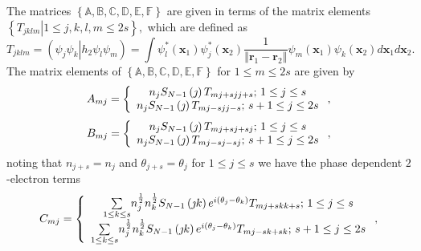 \documentclass[aps,preprint]{revtex4}%
\begin{document}
The matrices $\left\{  \mathbb{A},\mathbb{B},\mathbb{C},\mathbb{D}%
,\mathbb{E},\mathbb{F}\right\}  $ are given in terms of the matrix elements
$\left\{  \left.  T_{jklm}\right\vert 1\leq j,k,l,m\leq2s\right\}  ,$ which
are defined as
\begin{equation}
T_{jklm}=\left(  \left.  \psi_{j}\psi_{k}\right\vert h_{2}\psi_{l}\psi
_{m}\right)  =\int\psi_{l}^{\ast}\left(  \mathbf{x}_{1}\right)  \psi_{j}%
^{\ast}\left(  \mathbf{x}_{2}\right)  \frac{1}{\left\Vert \mathbf{r}%
_{1}-\mathbf{r}_{2}\right\Vert }\psi_{m}\left(  \mathbf{x}_{1}\right)
\psi_{k}\left(  \mathbf{x}_{2}\right)  d\mathbf{x}_{1}d\mathbf{x}_{2}.
\end{equation}
The matrix elements of $\left\{  \mathbb{A},\mathbb{B},\mathbb{C}%
,\mathbb{D},\mathbb{E},\mathbb{F}\right\}  $ for $1\leq m\leq2s$ are given by
\begin{equation}
A_{mj}=\left\{
\begin{array}
[c]{c}%
n_{j}S_{N-1}\left(  \jmath\right)  T_{mj+sjj+s};\,1\leq j\leq s\\
n_{j}S_{N-1}\left(  \jmath\right)  T_{mj-sjj-s};\,s+1\leq j\leq2s
\end{array}
\right.  , \label{a1}%
\end{equation}%
\begin{equation}
B_{mj}=\left\{
\begin{array}
[c]{c}%
n_{j}S_{N-1}\left(  \jmath\right)  T_{mj+sj+sj};\,1\leq j\leq s\\
n_{j}S_{N-1}\left(  \jmath\right)  T_{mj-sj-sj};\,s+1\leq j\leq2s
\end{array}
\right.  , \label{b1}%
\end{equation}
noting that $n_{j+s}=n_{j}$ and $\theta_{j+s}=\theta_{j}$ for $1\leq j\leq s$
we have the phase dependent $2$-electron terms
\begin{equation}
C_{mj}=\left\{
\begin{array}
[c]{c}%
{\textstyle\sum\limits_{1\leq k\leq s}}
n_{j}^{\frac{1}{2}}n_{k}^{\frac{1}{2}}S_{N-1}\left(  \jmath k\right)
e^{i\left(  \theta_{j}-\theta_{k}\right)  }T_{mj+skk+s};\,1\leq j\leq s\\%
{\textstyle\sum\limits_{1\leq k\leq s}}
n_{j}^{\frac{1}{2}}n_{k}^{\frac{1}{2}}S_{N-1}\left(  \jmath k\right)
e^{i\left(  \theta_{j}-\theta_{k}\right)  }T_{mj-sk+sk};\,s+1\leq j\leq2s
\end{array}
\right.  , \label{c1}%
\end{equation}%
\end{document}

